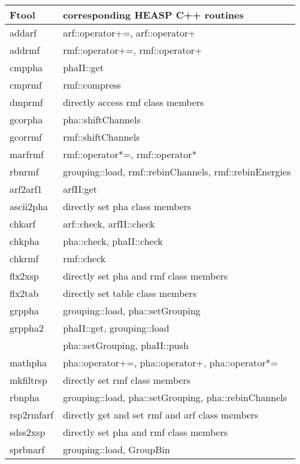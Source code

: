 \documentclass[11pt]{book}
\begin{document}
\begin{table}
  \begin{tabular}{ll}
    \hline\hline
    {Ftool} & {corresponding HEASP C++ routines} \\
    \hline
    addarf      & arf::operator+=, arf::operator+  \\
    addrmf      & rmf::operator+=, rmf::operator+  \\
    cmppha      & phaII::get \\
    cmprmf      & rmf::compress \\
    dmprmf      & directly access rmf class members \\
    gcorpha     & pha::shiftChannels \\
    gcorrmf     & rmf::shiftChannels \\
    marfrmf     & rmf::operator*=, rmf::operator* \\
    rbnrmf      & grouping::load, rmf::rebinChannels, rmf::rebinEnergies \\
    arf2arf1    & arfII:get \\
    ascii2pha   & directly set pha class members \\
    chkarf      & arf::check, arfII::check \\
    chkpha      & pha::check, phaII::check \\
    chkrmf      & rmf::check \\
    flx2xsp     & directly set pha and rmf class members \\
    flx2tab     & directly set table class members \\
    grppha      & grouping::load, pha::setGrouping \\
    grppha2     & phaII::get, grouping::load \\
                & pha::setGrouping, phaII::push \\
    mathpha     & pha::operator+=, pha::operator+, pha::operator*= \\
    mkfiltrsp   & directly set rmf class members \\
    rbnpha      & grouping::load, pha::setGrouping, pha::rebinChannels \\
    rsp2rmfarf  & directly get and set rmf and arf class members \\
    sdss2xsp    & directly set pha and rmf class members \\
    sprbnarf    & grouping::load, GroupBin \\
    \hline
  \end{tabular}
\end{table}
\end{document}
